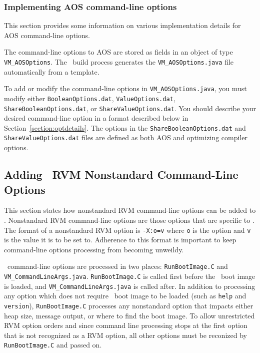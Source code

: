 \subsubsection{Implementing AOS command-line options}

This section provides some information on various
implementation details for AOS command-line options.

The command-line options to AOS are
stored as fields in an object of type {\tt VM\_AOSOptions}.
The \jp\ build process generates the {\tt VM\_AOSOptions.java} 
file automatically from a template.  

To add or modify the command-line options in {\tt VM\_AOSOptions.java},
you must modify either {\tt BooleanOptions.dat}, {\tt ValueOptions.dat},
{\tt ShareBooleanOptions.dat}, or {\tt ShareValueOptions.dat}.
You should describe your desired command-line option in a format 
described below in Section~\ref{section:optdetails}.
The options in the {\tt ShareBooleanOptions.dat} and {\tt ShareValueOptions.dat}
files are defined as both AOS and optimizing compiler options.

\subsection{Adding \jp\ RVM Nonstandard Command-Line Options}

This section states how nonstandard RVM command-line options can be added
to \jp.  
Nonstandard RVM command-line options are those options that are specific to \jp.
The format of a nonstandard RVM option is {\tt -X:o=v} where {\tt o} is the 
option and {\tt v} is the value it is to be set to.
Adherence to this format is important to keep command-line options processing
from becoming unweildy.

\jp\ command-line options are processed in two places: {\tt RunBootImage.C} and
{\tt VM\_CommandLineArgs.java}.  
{\tt RunBootImage.C} is called first before the \jp\ boot image is loaded,
and {\tt VM\_CommandLineArgs.java} is called after.
In addition to processing any option which does not require \jp\ boot image
to be loaded (such as {\tt help} and {\tt version}), 
{\tt RunBootImage.C} processes any nonstandard option that impacts either 
heap size, message output, or where to find the boot image.
To allow unrestricted RVM option orders and 
since command line processing stops at the first option that is not 
recognized as a RVM option, all other options must be reconized by
{\tt RunBootImage.C} and passed on.
